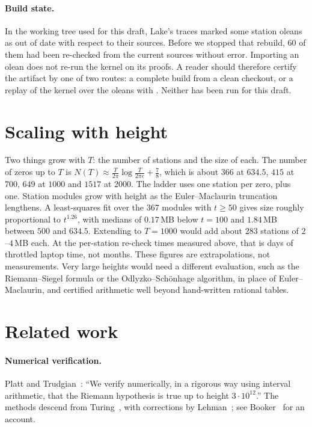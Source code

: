 \documentclass[11pt]{article}
\theoremstyle{definition}
\theoremstyle{remark}
\newcommand{\lean}[1]{\texttt{\detokenize{#1}}}
\begin{document}
\paragraph{Build state.} In the working tree used for this draft, Lake's traces marked some station oleans as out of date
with respect to their sources. Before we stopped that rebuild, $60$ of them had been re-checked from the current sources
without error. Importing an olean does not re-run the kernel on its proofs. A reader should therefore certify the
artifact by one of two routes: a complete build from a clean checkout, or a replay of the kernel over the oleans with
\lean{lean4checker}. Neither has been run for this draft.

\section{Scaling with height}\label{sec:scaling}

Two things grow with $T$: the number of stations and the size of each. The number of zeros up to $T$ is
$N(T)\approx\frac{T}{2\pi}\log\frac{T}{2\pi e}+\frac78$, which is about $366$ at $634.5$, $415$ at $700$, $649$ at
$1000$ and $1517$ at $2000$. The ladder uses one station per zero, plus one. Station modules grow with height as the
Euler--Maclaurin truncation lengthens. A least-squares fit over the $367$ modules with $t\ge50$ gives size roughly
proportional to $t^{1.26}$, with medians of $0.17$\,MB below $t=100$ and $1.84$\,MB between $500$ and $634.5$. Extending to
$T=1000$ would add about $283$ stations of $2$--$4$\,MB each. At the per-station re-check times measured above, that is
days of throttled laptop time, not months. These figures are extrapolations, not measurements. Very large heights
would need a different evaluation, such as the Riemann--Siegel formula or the Odlyzko--Sch\"onhage algorithm, in place
of Euler--Maclaurin, and certified arithmetic well beyond hand-written rational tables.

\section{Related work}\label{sec:related}

\paragraph{Numerical verification.} Platt and Trudgian~\cite{PlattTrudgian2021}: ``We verify numerically, in a rigorous way
using interval arithmetic, that the Riemann hypothesis is true up to height $3\cdot10^{12}$.'' The methods descend from
Turing~\cite{Turing1953}, with corrections by Lehman~\cite{Lehman1970}; see Booker~\cite{Booker2006} for an account.
\end{document}

